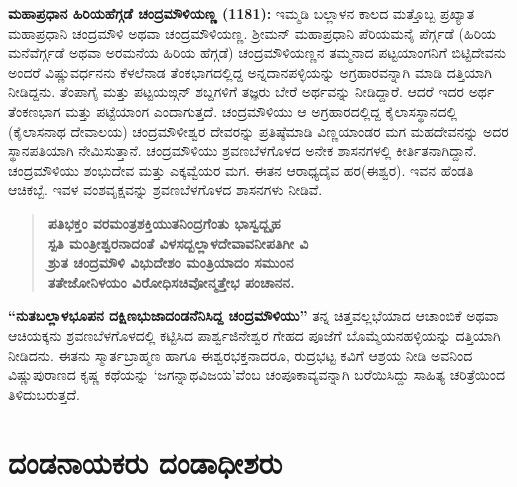 \textbf{ಮಹಾಪ್ರಧಾನ ಹಿರಿಯಹೆಗ್ಗಡೆ ಚಂದ್ರಮೌಳಿಯಣ್ಣ (1181):} ಇಮ್ಮಡಿ ಬಲ್ಲಾಳನ ಕಾಲದ ಮತ್ತೊಬ್ಬ ಪ್ರಖ್ಯಾತ ಮಹಾಪ್ರಧಾನಿ ಚಂದ್ರಮೌಳಿ ಅಥವಾ ಚಂದ್ರಮೌಳಿಯಣ್ಣ. ಶ‍್ರೀಮನ್​ ಮಹಾಪ್ರಧಾನಿ ಪೆರಿಯಮನೈ ಪೆರ್ಗ್ಗಡೆ (ಹಿರಿಯ ಮನೆವೆರ್ಗ್ಗಡೆ ಅಥವಾ ಅರಮನೆಯ ಹಿರಿಯ ಹೆಗ್ಗಡೆ) ಚಂದ್ರಮೌಳಿಯಣ್ಣನ ತಮ್ಮನಾದ ಪಟ್ಟಯಾಂಗನಿಗೆ ಬಿಟ್ಟಿದೇವನು ಅಂದರೆ ವಿಷ್ಣುವರ್ಧನನು ಕೆಳಲೆನಾಡ ತೆಂಕಭಾಗದಲ್ಲಿದ್ದ ಅನ್ನದಾನಪಳ್ಳಿಯನ್ನು ಅಗ್ರಹಾರವನ್ನಾಗಿ ಮಾಡಿ ದತ್ತಿಯಾಗಿ ನೀಡಿದ್ದನು. ತೆಂಪಾಗೈ ಮತ್ತು ಪಟ್ಟಯಙ್ಗನ್​ ಶಬ್ದಗಳಿಗೆ ತಜ್ಞರು ಬೇರೆ ಅರ್ಥವನ್ನು ನೀಡಿದ್ದಾರೆ. ಆದರೆ ಇದರ ಅರ್ಥ ತೆಂಕಣಭಾಗ ಮತ್ತು ಪಟ್ಟೆಯಾಂಗ ಎಂದಾಗುತ್ತದೆ. ಚಂದ್ರಮೌಳಿಯು ಆ ಅಗ್ರಹಾರದಲ್ಲಿದ್ದ ಕೈಲಾಸಸ್ಥಾನದಲ್ಲಿ (ಕೈಲಾಸನಾಥ ದೇವಾಲಯ) ಚಂದ್ರಮೌಳೀಶ್ವರ ದೇವರನ್ನು ಪ್ರತಿಷ್ಠೆಮಾಡಿ ವಿಣ್ಣಯಾಂಡರ ಮಗ ಮಹದೇವನನ್ನು ಅದರ ಸ್ಥಾನಪತಿಯಾಗಿ ನೇಮಿಸುತ್ತಾನೆ. ಚಂದ್ರಮೌಳಿಯು ಶ್ರವಣಬೆಳಗೊಳದ ಅನೇಕ ಶಾಸನಗಳಲ್ಲಿ ಕೀರ್ತಿತನಾಗಿದ್ದಾನೆ. ಚಂದ್ರಮೌಳಿಯು ಶಂಭುದೇವ ಮತ್ತು ಎಕ್ಕವ್ವೆಯರ ಮಗ. ಈತನ ಆರಾಧ್ಯದೈವ ಹರ(ಈಶ್ವರ). ಇವನ ಹೆಂಡತಿ ಆಚಿಕಬ್ಬೆ. ಇವಳ ವಂಶವೃಕ್ಷವನ್ನು ಶ್ರವಣಬೆಳಗೊಳದ ಶಾಸನಗಳು ನೀಡಿವೆ.

\begin{verse}
\textbf{ಪತಿಭಕ್ತಂ ವರಮಂತ್ರಶಕ್ತಿಯುತನಿಂದ್ರಗೆಂತು ಭಾಸ್ವದ್ಬೃಹ} \\\textbf{ಸ್ಪತಿ ಮಂತ್ರೀಶ್ವರನಾದಂತೆ ವಿಳಸದ್ಬಲ್ಲಾಳದೇವಾವನೀಪತಿಗೀ ವಿ} \\\textbf{ಶ್ರುತ ಚಂದ್ರಮೌಳಿ ವಿಭುದೇಶಂ ಮಂತ್ರಿಯಾದಂ ಸಮುಂನ} \\\textbf{ತತೇಜೋನಿಳಯಂ ವಿರೋಧಿಸಚಿವೋನ್ಮತ್ತೇಭ ಪಂಚಾನನ.}
\end{verse}

\textbf{“ನುತಬಲ್ಲಾಳಭೂಪನ ದಕ್ಷಿಣಭುಜಾದಂಡನೆನಿಸಿದ್ದ ಚಂದ್ರಮೌಳಿಯು”} ತನ್ನ ಚಿತ್ತವಲ್ಲಭೆಯಾದ ಆಚಾಂಬಿಕೆ ಅಥವಾ ಆಚಿಯಕ್ಕನು ಶ್ರವಣಬೆಳಗೊಳದಲ್ಲಿ ಕಟ್ಟಿಸಿದ ಪಾರ್ಶ್ವಜಿನೇಶ್ವರ ಗೇಹದ ಪೂಜೆಗೆ ಬೊಮ್ಮೆಯನಹಳ್ಳಿಯನ್ನು ದತ್ತಿಯಾಗಿ ನೀಡಿದನು. ಈತನು ಸ್ಮಾರ್ತಬ್ರಾಹ್ಮಣ ಹಾಗೂ ಈಶ್ವರಭಕ್ತನಾದರೂ, ರುದ್ರಭಟ್ಟ ಕವಿಗೆ ಆಶ್ರಯ ನೀಡಿ ಅವನಿಂದ ವಿಷ್ಣುಪುರಾಣದ ಕೃಷ್ಣ ಕಥೆಯನ್ನು ‘ಜಗನ್ನಾಥವಿಜಯ’ವೆಂಬ ಚಂಪೂಕಾವ್ಯವನ್ನಾಗಿ ಬರೆಯಿಸಿದ್ದು ಸಾಹಿತ್ಯ ಚರಿತ್ರೆಯಿಂದ ತಿಳಿದುಬರುತ್ತದೆ.


\section{ದಂಡನಾಯಕರು \enginline{-} ದಂಡಾಧೀಶರು}

